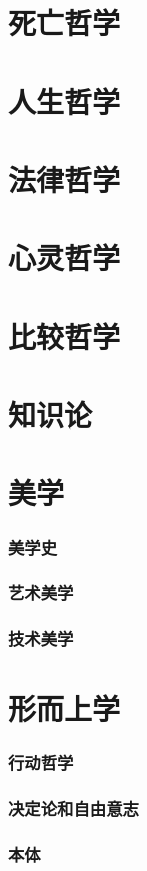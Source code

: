 \documentclass[UTF8]{../RepresentationUniverse}
\begin{document}
\chapter{死亡哲学}
\chapter{人生哲学}
\chapter{法律哲学}
\chapter{心灵哲学}
\chapter{比较哲学}
\chapter{知识论}




\chapter{美学}
    \subsection{美学史}
    \subsection{艺术美学}
    \subsection{技术美学}



\chapter{形而上学}
    \subsection{行动哲学}
    \subsection{决定论和自由意志}
    \subsection{本体}
\end{document}
